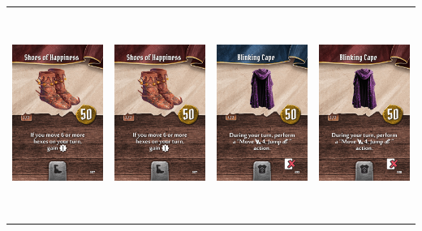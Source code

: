 \documentclass{minimal}
\begin{document}
{\begin{longtable}{llll}
\includegraphics[width=44mm,height=68mm]{./64-151/gh-072b-shoes-of-happiness.png} &
\includegraphics[width=44mm,height=68mm]{./64-151/gh-072b-shoes-of-happiness.png} &
\includegraphics[width=44mm,height=68mm]{./64-151/gh-073a-blinking-cape.png} &
\includegraphics[width=44mm,height=68mm]{./64-151/gh-073b-blinking-cape.png}\\ 

\end{longtable}}
\end{document}
